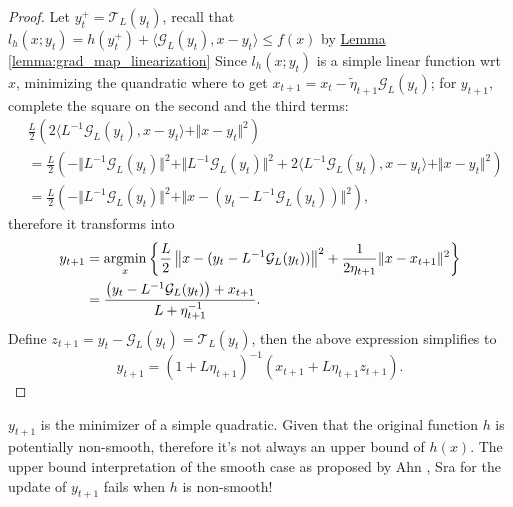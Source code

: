 \documentclass[12pt]{article}
\begin{document}
    \begin{proof}
        Let $y_t^+ = \mathcal T_L(y_t)$, recall that $l_h(x; y_t) = h(y_t^+) + \langle \mathcal G_L(y_t), x -y_t\rangle \le f(x)$ by 
        \hyperref[lemma:grad_map_linearization]
        {Lemma \ref*{lemma:grad_map_linearization}}
        Since $l_h(x; y_t)$ is a simple linear function wrt $x$, minimizing the quandratic where to get $x_{t + 1} = x_t - \tilde\eta_{t + 1} \mathcal G_L(y_t)$; for $y_{t + 1}$, complete the square on the second and the third terms: 
        \begin{align*}
            & \frac{L}{2}\left(
                2\langle L^{-1}\mathcal G_L(y_t), x - y_t\rangle + 
                \Vert x - y_t\Vert^2
            \right)
            \\
            &= 
            \frac{L}{2}
            \left(
                - \Vert L^{-1} \mathcal G_L(y_t)\Vert^2  
                + \Vert L^{-1} \mathcal G_L(y_t)\Vert^2 
                + 
                2\langle L^{-1} \mathcal G_L(y_t), x - y_t\rangle + 
                \Vert x - y_t\Vert^2
            \right)
            \\
            &= \frac{L}{2}\left(
                - \Vert L^{-1}\mathcal G_L(y_t)\Vert^2  
                + \Vert x - (y_t - L^{-1}\mathcal G_L(y_t))
                \Vert^2
            \right), 
        \end{align*}
        therefore it transforms into 
        \begin{align*}
            y_{t + 1} &=\mathop{\rm argmin}\limits_{x} \left\lbrace
                \frac{L}{2}\left\Vert 
                    x - (y_t - L^{-1}\mathcal G_L(y_t))
                \right\Vert^2
                + \frac{1}{2\eta_{t + 1}}\Vert x - x_{t + 1}\Vert^2
            \right\rbrace
            \\
            &=
            \frac{
                \left(y_t - L^{-1}\mathcal G_L(y_t)\right) + x_{t + 1}
            }{L + \eta_{t + 1}^{-1}}.
        \end{align*}
        Define $z_{t + 1} = y_t - \mathcal G_L(y_t) = \mathcal T_L(y_t)$, then the above expression simplifies to 
        $$
            y_{t + 1} = (1 + L\eta_{t +1})^{-1}(x_{t + 1}+ L\eta_{t + 1}z_{t + 1}). 
        $$
    \end{proof}
    \begin{remark}
        $y_{t + 1}$ is the minimizer of a simple quadratic. 
        Given that the original function $h$ is potentially non-smooth, therefore it's not always an upper bound of $h(x)$. 
        The upper bound interpretation of the smooth case as proposed by Ahn \cite{ahn_understanding_2022}, Sra for the update of $y_{t + 1}$ fails when $h$ is non-smooth! 
    \end{remark}
\end{document}
